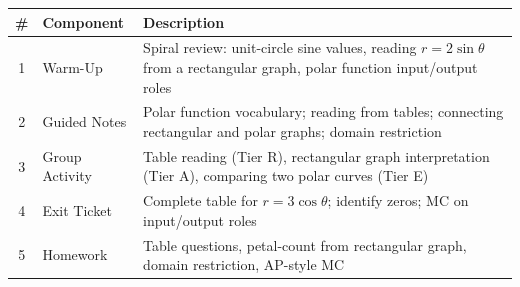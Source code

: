 \documentclass[10pt]{article}
\begin{document}
\begin{tocbox}
\small
\renewcommand{\arraystretch}{1.5}
\begin{tabularx}{\linewidth}{@{} c l X @{}}
\rowcolor{sky}
\textbf{\#} & \textbf{Component} & \textbf{Description} \\
\midrule
1 & Warm-Up        & Spiral review: unit-circle sine values, reading $r = 2\sin\theta$ from a rectangular graph, polar function input/output roles \\
2 & Guided Notes   & Polar function vocabulary; reading from tables; connecting rectangular and polar graphs; domain restriction \\
3 & Group Activity & Table reading (Tier R), rectangular graph interpretation (Tier A), comparing two polar curves (Tier E) \\
4 & Exit Ticket    & Complete table for $r = 3\cos\theta$; identify zeros; MC on input/output roles \\
5 & Homework       & Table questions, petal-count from rectangular graph, domain restriction, AP-style MC \\
\end{tabularx}
\end{tocbox}
\end{document}
